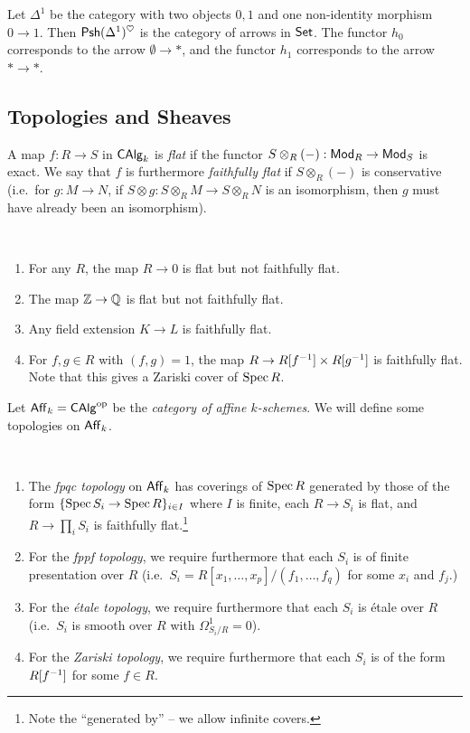 \documentclass{amsart}
\begin{document}
\begin{ex}
Let $\Delta^1$ be the category with two objects $0, 1$ and one non-identity morphism $0 \to 1$.
Then $\mathsf{Psh}(\Delta^1)^\heartsuit$ is the category of arrows in $\mathsf{Set}$.
The functor $h_0$ corresponds to the arrow $\emptyset \to *$, and the functor $h_1$ corresponds to the arrow $* \to *$.
\end{ex}

\subsection{Topologies and Sheaves}

\begin{dfn}
A map $f: R \to S$ in $\mathsf{CAlg}_k$ is \emph{flat} if the functor $S \otimes_R (-): \mathsf{Mod}_R \to \mathsf{Mod}_S$ is exact.
We say that $f$ is furthermore \emph{faithfully flat} if $S \otimes_R (-)$ is conservative (i.e.\ for $g: M \to N$, if $S \otimes g: S \otimes_R M \to S \otimes_R N$ is an isomorphism, then $g$ must have already been an isomorphism).
\end{dfn}

\begin{ex}
\,
\begin{enumerate}
	\item For any $R$, the map $R \to 0$ is flat but not faithfully flat.
	\item The map $\mathbb{Z} \to \mathbb{Q}$ is flat but not faithfully flat.
	\item Any field extension $K \to L$ is faithfully flat.
	\item For $f, g \in R$ with $(f, g) = 1$, the map $R \to R[f^{-1}] \times R[g^{-1}]$ is faithfully flat.
	Note that this gives a Zariski cover of $\operatorname{Spec} R$.
\end{enumerate}
\end{ex}

Let $\mathsf{Aff}_k = \mathsf{CAlg}^{\mathrm{op}}$ be the \emph{category of affine $k$-schemes}.
We will define some topologies on $\mathsf{Aff}_k$.

\begin{dfn}
\,
\begin{enumerate}
	\item The \emph{fpqc topology} on $\mathsf{Aff}_k$ has coverings of $\operatorname{Spec} R$ generated by those of the form $\{ \operatorname{Spec} S_i \to \operatorname{Spec} R\}_{i \in I}$ where $I$ is finite, each $R \to S_i$ is flat, and $R \to \prod_i S_i$ is faithfully flat.\footnote{Note the ``generated by'' -- we allow infinite covers.}
	\item For the \emph{fppf topology}, we require furthermore that each $S_i$ is of finite presentation over $R$ (i.e.\ $S_i = R[x_1, \dots, x_p] / (f_1, \dots, f_q)$ for some $x_i$ and $f_j$.)
	\item For the \emph{\'etale topology}, we require furthermore that each $S_i$ is \'etale over $R$ (i.e.\ $S_i$ is smooth over $R$ with $\Omega^1_{S_i/R} = 0$).
	\item For the \emph{Zariski topology}, we require furthermore that each $S_i$ is of the form $R[f^{-1}]$ for some $f \in R$.
\end{enumerate}
\end{dfn}
\end{document}
